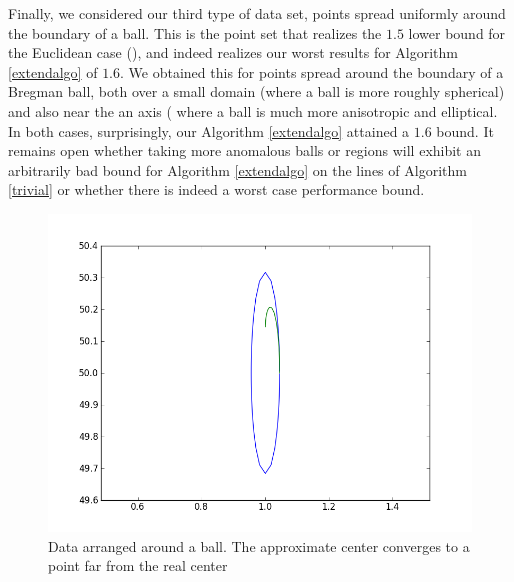\documentclass[11pt]{myclass}
\begin{document}
Finally, we considered our third type of data set, points spread uniformly around the boundary of a ball. This is the point set that realizes the $1.5$ lower bound for the Euclidean case (\cite{onepointfive}), and indeed realizes our worst results for Algorithm \ref{extendalgo} of $1.6$. We obtained this for points spread around the boundary of a Bregman ball, both over a small domain (where a ball is more roughly spherical) and also near the an axis ( where a ball is much more anisotropic and elliptical. In both cases, surprisingly, our Algorithm \ref{extendalgo} attained a $1.6$ bound. It remains open whether taking more anomalous balls 
or regions will exhibit an arbitrarily bad bound for Algorithm \ref{extendalgo} on the lines of Algorithm \ref{trivial} or whether
there is indeed a worst case performance bound.

\begin{figure}[H]
  \begin{center}
    \includegraphics[scale = 0.6]{../figures/ellipse-bad.png}
  \end{center}
  \caption{Data arranged around a ball. The approximate center converges to a point far from the real center}
\end{figure}
\end{document}
